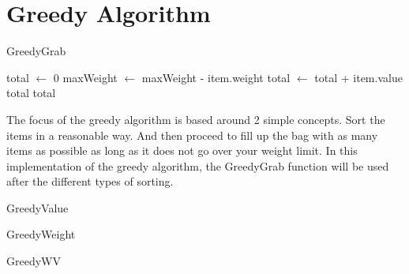 \documentclass[10pt, letterpaper]{article}
\begin{document}
\section{Greedy Algorithm}

\begin{algorithm}
  \begin{algorithmic}
    \caption{GreedyGrab}\label{GreedyGrab}
    \State total $\gets$ 0
    \State maxWeight $\gets$ maxWeight - item.weight
    \State total $\gets$ total + item.value
    \EndIf
    \Return total
    \EndIf
    \EndFor
    \Return total
    \EndFunction
  \end{algorithmic}
\end{algorithm}

The focus of the greedy algorithm is based around 2 simple concepts. Sort the items in a reasonable way. And then proceed to fill up the bag with as many items as possible as long as it does not go over your weight limit. In this implementation of the greedy algorithm, the GreedyGrab function will be used after the different types of sorting.

\begin{algorithm}
  \begin{algorithmic}
    \caption{GreedyValue}\label{GreedyValue}

    \EndFunction
  \end{algorithmic}
\end{algorithm}

\begin{algorithm}
  \begin{algorithmic}
    \caption{GreedyWeight}\label{GreedyWeight}
    
    \EndFunction
  \end{algorithmic}
\end{algorithm}

\begin{algorithm}
  \begin{algorithmic}
    \caption{GreedyWV}\label{GreedyWV}

    \EndFunction
  \end{algorithmic}
\end{algorithm}
\end{document}
